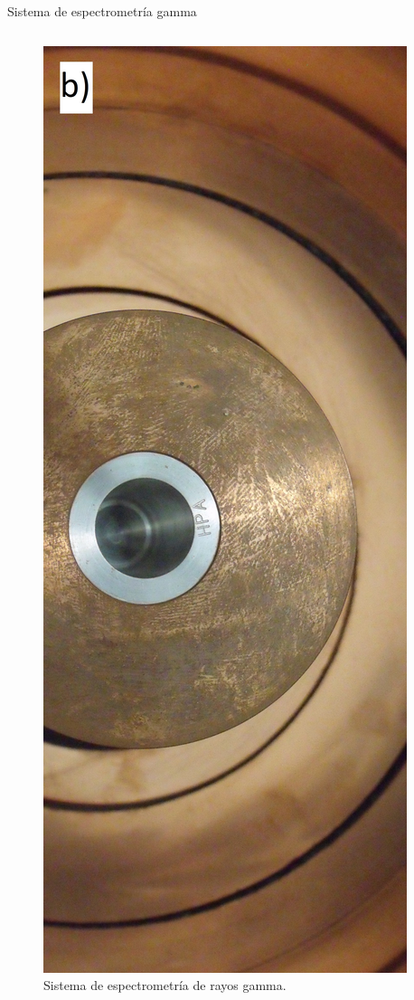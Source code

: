 \documentclass[9pt]{beamer}
\begin{document}
\begin{frame}{Sistema de espectrometría gamma}
\begin{columns}
\begin{column}{0.45\textwidth}
\begin{figure}
			\includegraphics[height=0.45\textheight]{Imagenes/DSCF1886.jpg}
			\caption{\justifying Sistema de espectrometría de rayos gamma.}\label{Fig-G1System}
\end{figure}
		\end{column}

\end{columns}
\end{frame}
\end{document}
